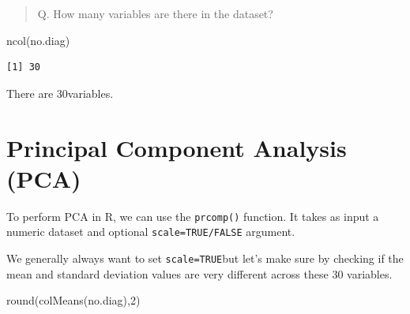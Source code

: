 \documentclass[
  letterpaper,
  DIV=11,
  numbers=noendperiod]{scrartcl}
\newenvironment{Shaded}{\begin{snugshade}}{\end{snugshade}}
\newcommand{\DecValTok}[1]{\textcolor[rgb]{0.68,0.00,0.00}{#1}}
\newcommand{\FunctionTok}[1]{\textcolor[rgb]{0.28,0.35,0.67}{#1}}
\newcommand{\NormalTok}[1]{\textcolor[rgb]{0.00,0.23,0.31}{#1}}
\begin{document}
\begin{quote}
Q. How many variables are there in the dataset?
\end{quote}

\begin{Shaded}
\begin{Highlighting}[]
\FunctionTok{ncol}\NormalTok{(no.diag)}
\end{Highlighting}
\end{Shaded}

\begin{verbatim}
[1] 30
\end{verbatim}

There are 30variables.

\hypertarget{principal-component-analysis-pca}{%
\section{Principal Component Analysis
(PCA)}\label{principal-component-analysis-pca}}

To perform PCA in R, we can use the \texttt{prcomp()} function. It takes
as input a numeric dataset and optional \texttt{scale=TRUE/FALSE}
argument.

We generally always want to set \texttt{scale=TRUE}but let's make sure
by checking if the mean and standard deviation values are very different
across these 30 variables.

\begin{Shaded}
\begin{Highlighting}[]
\FunctionTok{round}\NormalTok{(}\FunctionTok{colMeans}\NormalTok{(no.diag),}\DecValTok{2}\NormalTok{)}
\end{Highlighting}
\end{Shaded}
\end{document}
